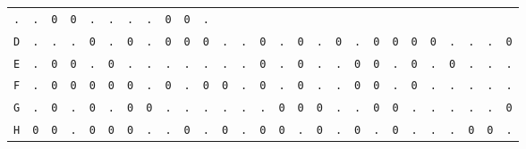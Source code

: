 \begin{figure}[H]
\begin{center}
{\begin{tabular}{c|cccccccccccccccccccccccccc}
        \texttt{.} & \texttt{.} & \texttt{0} & \texttt{0} &
        \texttt{.} & \texttt{.} & \texttt{.} & \texttt{.} &
        \texttt{0} & \texttt{0} & \texttt{.}                             \\
        \texttt{D} & \texttt{.} & \texttt{.} & \texttt{.} &
        \texttt{0} & \texttt{.} & \texttt{0} & \texttt{.} &
        \texttt{0} & \texttt{0} & \texttt{0} & \texttt{.} &
        \texttt{.} & \texttt{0} & \texttt{.} & \texttt{0} &
        \texttt{.} & \texttt{0} & \texttt{.} & \texttt{0} &
        \texttt{0} & \texttt{0} & \texttt{0} & \texttt{.} &
        \texttt{.} & \texttt{.} & \texttt{0}                             \\
        \texttt{E} & \texttt{.} & \texttt{0} & \texttt{0} &
        \texttt{.} & \texttt{0} & \texttt{.} & \texttt{.} &
        \texttt{.} & \texttt{.} & \texttt{.} & \texttt{.} &
        \texttt{.} & \texttt{0} & \texttt{.} & \texttt{0} &
        \texttt{.} & \texttt{.} & \texttt{0} & \texttt{0} &
        \texttt{.} & \texttt{0} & \texttt{.} & \texttt{0} &
        \texttt{.} & \texttt{.} & \texttt{.}                             \\
        \texttt{F} & \texttt{.} & \texttt{0} & \texttt{0} &
        \texttt{0} & \texttt{0} & \texttt{0} & \texttt{.} &
        \texttt{0} & \texttt{.} & \texttt{0} & \texttt{0} &
        \texttt{.} & \texttt{0} & \texttt{.} & \texttt{0} &
        \texttt{.} & \texttt{.} & \texttt{0} & \texttt{0} &
        \texttt{.} & \texttt{0} & \texttt{.} & \texttt{.} &
        \texttt{.} & \texttt{.} & \texttt{.}                             \\
        \texttt{G} & \texttt{.} & \texttt{0} & \texttt{.} &
        \texttt{0} & \texttt{.} & \texttt{0} & \texttt{0} &
        \texttt{.} & \texttt{.} & \texttt{.} & \texttt{.} &
        \texttt{.} & \texttt{.} & \texttt{0} & \texttt{0} &
        \texttt{0} & \texttt{.} & \texttt{.} & \texttt{0} &
        \texttt{0} & \texttt{.} & \texttt{.} & \texttt{.} &
        \texttt{.} & \texttt{.} & \texttt{0}                             \\
        \texttt{H} & \texttt{0} & \texttt{0} & \texttt{.} &
        \texttt{0} & \texttt{0} & \texttt{0} & \texttt{.} &
        \texttt{.} & \texttt{0} & \texttt{.} & \texttt{0} &
        \texttt{.} & \texttt{0} & \texttt{0} & \texttt{.} &
        \texttt{0} & \texttt{.} & \texttt{0} & \texttt{.} &
        \texttt{0} & \texttt{.} & \texttt{.} & \texttt{.} &
        \texttt{0} & \texttt{0} & \texttt{.}                             \\

\end{tabular}}
\end{center}
\end{figure}
